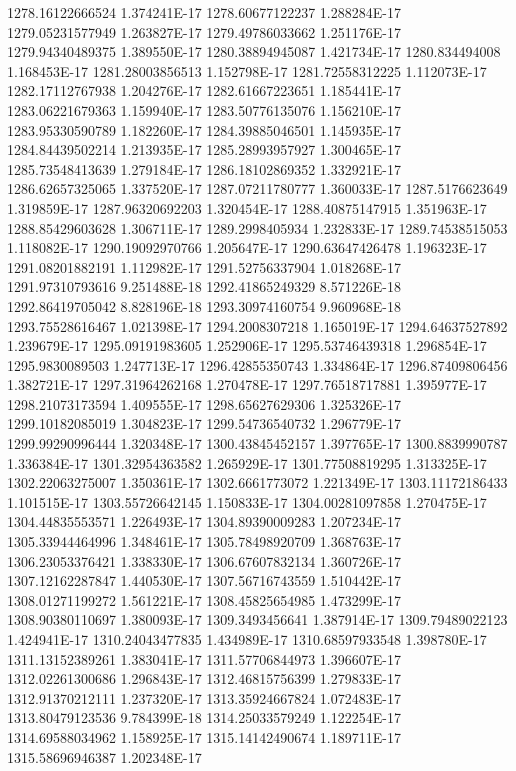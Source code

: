 1278.16122666524  1.374241E-17
1278.60677122237  1.288284E-17
1279.05231577949  1.263827E-17
1279.49786033662  1.251176E-17
1279.94340489375  1.389550E-17
1280.38894945087  1.421734E-17
1280.834494008  1.168453E-17
1281.28003856513  1.152798E-17
1281.72558312225  1.112073E-17
1282.17112767938  1.204276E-17
1282.61667223651  1.185441E-17
1283.06221679363  1.159940E-17
1283.50776135076  1.156210E-17
1283.95330590789  1.182260E-17
1284.39885046501  1.145935E-17
1284.84439502214  1.213935E-17
1285.28993957927  1.300465E-17
1285.73548413639  1.279184E-17
1286.18102869352  1.332921E-17
1286.62657325065  1.337520E-17
1287.07211780777  1.360033E-17
1287.5176623649  1.319859E-17
1287.96320692203  1.320454E-17
1288.40875147915  1.351963E-17
1288.85429603628  1.306711E-17
1289.2998405934  1.232833E-17
1289.74538515053  1.118082E-17
1290.19092970766  1.205647E-17
1290.63647426478  1.196323E-17
1291.08201882191  1.112982E-17
1291.52756337904  1.018268E-17
1291.97310793616  9.251488E-18
1292.41865249329  8.571226E-18
1292.86419705042  8.828196E-18
1293.30974160754  9.960968E-18
1293.75528616467  1.021398E-17
1294.2008307218  1.165019E-17
1294.64637527892  1.239679E-17
1295.09191983605  1.252906E-17
1295.53746439318  1.296854E-17
1295.9830089503  1.247713E-17
1296.42855350743  1.334864E-17
1296.87409806456  1.382721E-17
1297.31964262168  1.270478E-17
1297.76518717881  1.395977E-17
1298.21073173594  1.409555E-17
1298.65627629306  1.325326E-17
1299.10182085019  1.304823E-17
1299.54736540732  1.296779E-17
1299.99290996444  1.320348E-17
1300.43845452157  1.397765E-17
1300.8839990787  1.336384E-17
1301.32954363582  1.265929E-17
1301.77508819295  1.313325E-17
1302.22063275007  1.350361E-17
1302.6661773072  1.221349E-17
1303.11172186433  1.101515E-17
1303.55726642145  1.150833E-17
1304.00281097858  1.270475E-17
1304.44835553571  1.226493E-17
1304.89390009283  1.207234E-17
1305.33944464996  1.348461E-17
1305.78498920709  1.368763E-17
1306.23053376421  1.338330E-17
1306.67607832134  1.360726E-17
1307.12162287847  1.440530E-17
1307.56716743559  1.510442E-17
1308.01271199272  1.561221E-17
1308.45825654985  1.473299E-17
1308.90380110697  1.380093E-17
1309.3493456641  1.387914E-17
1309.79489022123  1.424941E-17
1310.24043477835  1.434989E-17
1310.68597933548  1.398780E-17
1311.13152389261  1.383041E-17
1311.57706844973  1.396607E-17
1312.02261300686  1.296843E-17
1312.46815756399  1.279833E-17
1312.91370212111  1.237320E-17
1313.35924667824  1.072483E-17
1313.80479123536  9.784399E-18
1314.25033579249  1.122254E-17
1314.69588034962  1.158925E-17
1315.14142490674  1.189711E-17
1315.58696946387  1.202348E-17
